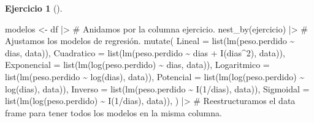 \documentclass[
  a4paper,
]{scrreport}
\newenvironment{Shaded}{\begin{snugshade}}{\end{snugshade}}
\newcommand{\AttributeTok}[1]{\textcolor[rgb]{0.40,0.45,0.13}{#1}}
\newcommand{\CommentTok}[1]{\textcolor[rgb]{0.37,0.37,0.37}{#1}}
\newcommand{\DecValTok}[1]{\textcolor[rgb]{0.68,0.00,0.00}{#1}}
\newcommand{\FunctionTok}[1]{\textcolor[rgb]{0.28,0.35,0.67}{#1}}
\newcommand{\NormalTok}[1]{\textcolor[rgb]{0.00,0.23,0.31}{#1}}
\newcommand{\OtherTok}[1]{\textcolor[rgb]{0.00,0.23,0.31}{#1}}
\newcommand{\SpecialCharTok}[1]{\textcolor[rgb]{0.37,0.37,0.37}{#1}}
\theoremstyle{definition}
\newtheorem{exercise}{Ejercicio}[chapter]
\theoremstyle{remark}
\begin{document}
\begin{exercise}[]
\begin{enumerate}
  \begin{tcolorbox}[enhanced jigsaw, coltitle=black, left=2mm, colback=white, leftrule=.75mm, toptitle=1mm, breakable, bottomrule=.15mm, titlerule=0mm, bottomtitle=1mm, title=\textcolor{quarto-callout-tip-color}{\faLightbulb}\hspace{0.5em}{Solución}, arc=.35mm, toprule=.15mm, rightrule=.15mm, colframe=quarto-callout-tip-color-frame, opacityback=0, colbacktitle=quarto-callout-tip-color!10!white, opacitybacktitle=0.6]

\begin{Shaded}
\begin{Highlighting}[]
\NormalTok{modelos }\OtherTok{\textless{}{-}}\NormalTok{ df  }\SpecialCharTok{|\textgreater{}} 
    \CommentTok{\# Anidamos por la columna ejercicio.}
    \FunctionTok{nest\_by}\NormalTok{(ejercicio)  }\SpecialCharTok{|\textgreater{}} 
    \CommentTok{\# Ajustamos los modelos de regresión.}
    \FunctionTok{mutate}\NormalTok{(}
        \AttributeTok{Lineal =} \FunctionTok{list}\NormalTok{(}\FunctionTok{lm}\NormalTok{(peso.perdido }\SpecialCharTok{\textasciitilde{}}\NormalTok{ dias, data)),}
        \AttributeTok{Cuadratico =} \FunctionTok{list}\NormalTok{(}\FunctionTok{lm}\NormalTok{(peso.perdido }\SpecialCharTok{\textasciitilde{}}\NormalTok{ dias }\SpecialCharTok{+} \FunctionTok{I}\NormalTok{(dias}\SpecialCharTok{\^{}}\DecValTok{2}\NormalTok{), data)),}
        \AttributeTok{Exponencial =} \FunctionTok{list}\NormalTok{(}\FunctionTok{lm}\NormalTok{(}\FunctionTok{log}\NormalTok{(peso.perdido) }\SpecialCharTok{\textasciitilde{}}\NormalTok{ dias, data)),}
        \AttributeTok{Logaritmico =} \FunctionTok{list}\NormalTok{(}\FunctionTok{lm}\NormalTok{(peso.perdido }\SpecialCharTok{\textasciitilde{}} \FunctionTok{log}\NormalTok{(dias), data)),}
        \AttributeTok{Potencial =} \FunctionTok{list}\NormalTok{(}\FunctionTok{lm}\NormalTok{(}\FunctionTok{log}\NormalTok{(peso.perdido) }\SpecialCharTok{\textasciitilde{}} \FunctionTok{log}\NormalTok{(dias), data)),}
        \AttributeTok{Inverso =} \FunctionTok{list}\NormalTok{(}\FunctionTok{lm}\NormalTok{(peso.perdido }\SpecialCharTok{\textasciitilde{}} \FunctionTok{I}\NormalTok{(}\DecValTok{1}\SpecialCharTok{/}\NormalTok{dias), data)),}
        \AttributeTok{Sigmoidal =} \FunctionTok{list}\NormalTok{(}\FunctionTok{lm}\NormalTok{(}\FunctionTok{log}\NormalTok{(peso.perdido) }\SpecialCharTok{\textasciitilde{}} \FunctionTok{I}\NormalTok{(}\DecValTok{1}\SpecialCharTok{/}\NormalTok{dias), data)),}
\NormalTok{    )  }\SpecialCharTok{|\textgreater{}} 
    \CommentTok{\# Reestructuramos el data frame para tener todos los modelos en la misma columna.}

\end{Highlighting}
\end{Shaded}
\end{tcolorbox}
\end{enumerate}
\end{exercise}
\end{document}
